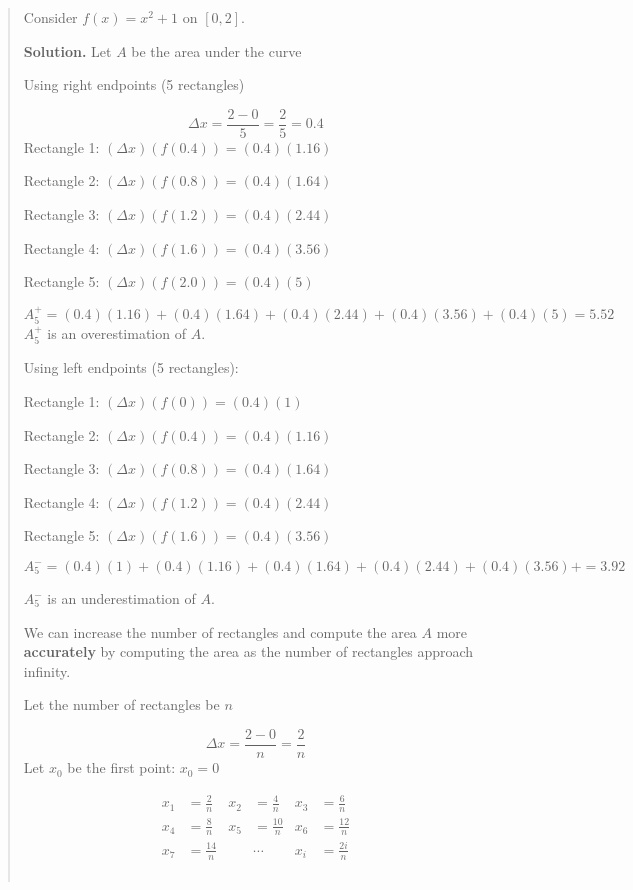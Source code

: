\documentclass[
]{article}
\begin{document}
\begin{quote}
Consider \(f(x) = x^2 +1\) on \([0,2]\).

\textbf{Solution.} Let \(A\) be the area under the curve

Using right endpoints (5 rectangles)

\[ \Delta x = \frac{2-0}{5} = \frac{2}{5} = 0.4 \] Rectangle 1:
\((\Delta x)(f(0.4)) = (0.4)(1.16)\)

Rectangle 2: \((\Delta x)(f(0.8)) = (0.4)(1.64)\)

Rectangle 3: \((\Delta x)(f(1.2)) = (0.4)(2.44)\)

Rectangle 4: \((\Delta x)(f(1.6)) = (0.4)(3.56)\)

Rectangle 5: \((\Delta x)(f(2.0)) = (0.4)(5)\)

\[ A_5^+ = (0.4)(1.16) + (0.4)(1.64) + (0.4)(2.44) + (0.4)(3.56) +(0.4)(5) = 5.52 \]
\(A_5^+\) is an overestimation of \(A\).

Using left endpoints (5 rectangles):

Rectangle 1: \((\Delta x)(f(0)) = (0.4)(1)\)

Rectangle 2: \((\Delta x)(f(0.4)) = (0.4)(1.16)\)

Rectangle 3: \((\Delta x)(f(0.8)) = (0.4)(1.64)\)

Rectangle 4: \((\Delta x)(f(1.2)) = (0.4)(2.44)\)

Rectangle 5: \((\Delta x)(f(1.6)) = (0.4)(3.56)\)

\[ A_5^- = (0.4)(1) + (0.4)(1.16) + (0.4)(1.64) + (0.4)(2.44) + (0.4)(3.56) + =3.92 \]

\(A_5^-\) is an underestimation of \(A\).

We can increase the number of rectangles and compute the area \(A\) more
\textbf{accurately} by computing the area as the number of rectangles
approach infinity.

Let the number of rectangles be \(n\)

\[ \Delta x = \frac{2-0}{n}=\frac{2}{n} \] Let \(x_0\) be the first
point: \(x_0=0\)

\begin{align*}
x_1 &= \frac{2}{n} & x_2 &= \frac{4}{n} & x_3 &= \frac{6}{n}\\
x_4 &= \frac{8}{n} & x_5 &= \frac{10}{n} & x_6 &= \frac{12}{n}\\
x_7 &= \frac{14}{n} &    &\cdots      & x_i &= \frac{2i}{n}
\end{align*}\\


\end{quote}
\end{document}
